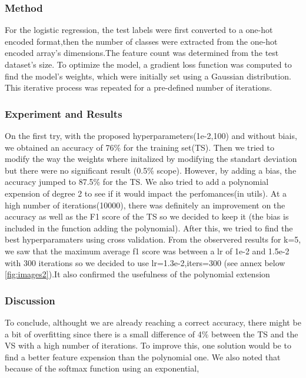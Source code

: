\subsubsection{Method}
For the logistic regression, the test labels were first converted to a one-hot encoded format,then the number of classes were extracted from the one-hot encoded array's dimensions.The feature count was determined from the test dataset's size. To optimize the model, a gradient loss function was computed to find the model's weights, which were initially set using a Gaussian distribution. This iterative process was repeated for a pre-defined number of iterations.

\subsubsection{Experiment and Results}
On the first try, with the proposed hyperparameters(1e-2,100) and without biais, we obtained an accuracy of 76\% for the training set(TS).
Then we tried to modify the way the weights where initalized by modifying the standart deviation but there were no significant result (0.5\% scope). However, by adding a bias, the accuracy jumped to 87.5\% for the TS. We also tried to add a polynomial expension of degree 2 to see if it would impact the perfomances(in utils). At a high number of iterations(10000), there was definitely an improvement on the accuracy as well as the F1 score of the TS so we decided to keep it (the bias is included in the function adding the polynomial). After this, we tried to find the best hyperparamaters using cross validation. From the observered results for k=5, we saw that the maximum average f1 score was between a lr of 1e-2 and 1.5e-2 with 300 iterations so we decided to use lr=1.3e-2,iters=300 (see annex below \cref{fig:images2}).It also confirmed the usefulness of the polynomial extension\\

\subsubsection{Discussion}
To conclude, althought we are already reaching a correct accuracy, there might be a bit of overfitting since there is a small difference of 4\% between the TS and the VS with a high number of iterations. To improve this, one solution would be to find a better feature expension than the polynomial one. We also noted that because of the softmax function using an exponential, 


